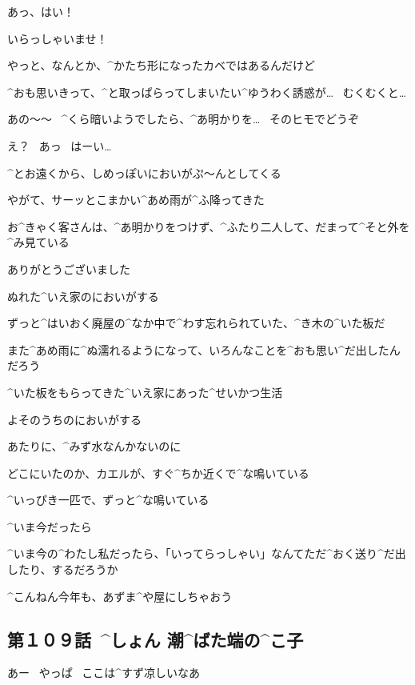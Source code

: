 \Alpha あっ、はい！

\Alpha いらっしゃいませ！

\Alpha やっと、なんとか、^{かたち}{形}になったカベではあるんだけど

\Alpha ^{おも}{思}いきって、^{と}{取}っぱらってしまいたい^{ゆうわく}{誘惑}が…
\ むくむくと…

\page[121]
\Alpha あの〜〜
\ ^{くら}{暗}いようでしたら、^{あ}{明}かりを…
\ そのヒモでどうぞ

\Person え？
\ あっ
\ はーい…

\page[122]
\Alpha ^{とお}{遠}くから、しめっぽいにおいがぷ〜んとしてくる

\Alpha やがて、サーッとこまかい^{あめ}{雨}が^{ふ}{降}ってきた

\Alpha お^{きゃく}{客}さんは、^{あ}{明}かりをつけず、^{ふたり}{二人}して、だまって^{そと}{外}を^{み}{見}ている

\page[124]
\Alpha ありがとうございました

\page[125]
\Alpha ぬれた^{いえ}{家}のにおいがする

\Alpha ずっと^{はいおく}{廃屋}の^{なか}{中}で^{わす}{忘}れられていた、^{き}{木}の^{いた}{板}だ

\Alpha また^{あめ}{雨}に^{ぬ}{濡}れるようになって、いろんなことを^{おも}{思}い^{だ}{出}したんだろう

\page[126]
\Alpha ^{いた}{板}をもらってきた^{いえ}{家}にあった^{せいかつ}{生活}

\Alpha よそのうちのにおいがする

\page[127]
\Alpha あたりに、^{みず}{水}なんかないのに

\Alpha どこにいたのか、カエルが、すぐ^{ちか}{近}くで^{な}{鳴}いている

\page[128]
\Alpha ^{いっぴき}{一匹}で、ずっと^{な}{鳴}いている

\page[129]
\Alpha ^{いま}{今}だったら

\page[130]
\Alpha ^{いま}{今}の^{わたし}{私}だったら、「いってらっしゃい」なんてただ^{おく}{送}り^{だ}{出}したり、するだろうか

\page[132]
\Alpha ^{こんねん}{今年}も、あずま^{や}{屋}にしちゃおう


\subsection{第１０９話\ ^{しょん }{潮}^{ばた}{端}の^{こ}{子}}

\page[137]
\Alpha あー
\ やっぱ
\ ここは^{すず}{凉}しいなあ

